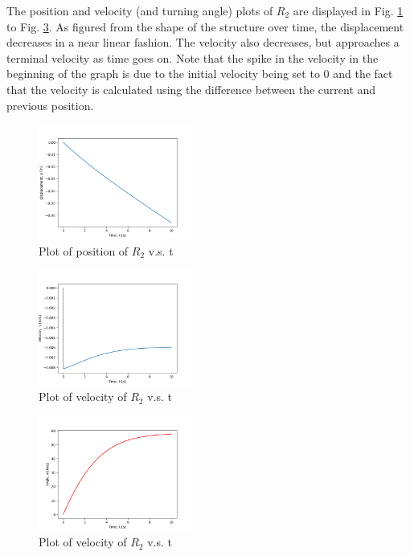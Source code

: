 \documentclass[letterpaper, 10 pt, conference]{ieeeconf}  %
\begin{document}
The position and velocity (and turning angle) plots of $R_2$ are displayed in Fig. \ref{"fig:p1q1_position"} to Fig. \ref{"fig:p1q1_angle"}. As figured from the shape of the structure over time, the displacement decreases in a near linear fashion. The velocity also decreases, but approaches a terminal velocity as time goes on. Note that the spike in the velocity in the beginning of the graph is due to the initial velocity being set to 0 and the fact that the velocity is calculated using the difference between the current and previous position.

\begin{figure}[!ht]
        \centering
        \includegraphics[width=0.45\textwidth,keepaspectratio]{p1q1fallingBeam_p1_implicit.png}
        \caption{Plot of position of $R_2$ v.s. t}
        \label{"fig:p1q1_position"}
\end{figure}

\begin{figure}[!ht]
        \centering
        \includegraphics[width=0.45\textwidth,keepaspectratio]{p1q1fallingBeam_velocity_p1_implicit.png}
        \caption{Plot of velocity of $R_2$ v.s. t}
        \label{"fig:p1q1_velocity"}
\end{figure}

\begin{figure}[!ht]
        \centering
        \includegraphics[width=0.45\textwidth,keepaspectratio]{p1q1fallingBeam_angle_p1_implicit.png}
        \caption{Plot of velocity of $R_2$ v.s. t}
        \label{"fig:p1q1_angle"}
\end{figure}
\end{document}
